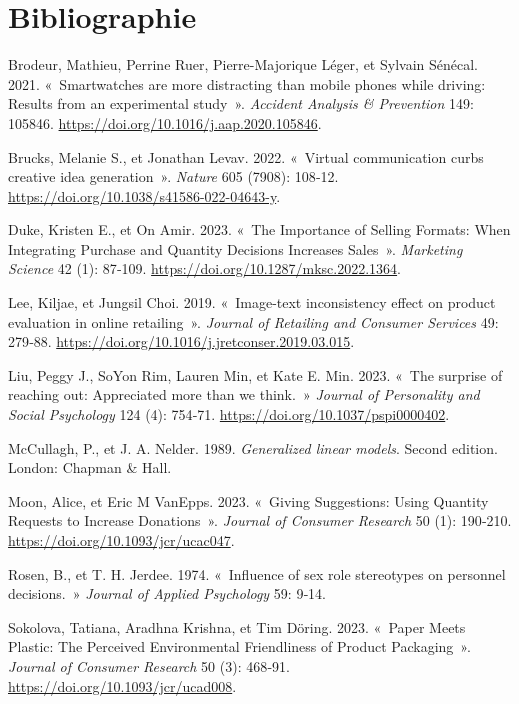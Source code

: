\documentclass[
  11pt,
  letterpaper,
]{scrbook}
\newlength{\cslhangindent}
\newenvironment{CSLReferences}[2] %
 {\begin{list}{}{%
  \setlength{\itemindent}{0pt}
  \setlength{\leftmargin}{0pt}
  \setlength{\parsep}{0pt}
  \ifodd #1
   \setlength{\leftmargin}{\cslhangindent}
   \setlength{\itemindent}{-1\cslhangindent}
  \fi
  \setlength{\itemsep}{#2\baselineskip}}}
 {\end{list}}
\theoremstyle{definition}
\theoremstyle{definition}
\theoremstyle{remark}
\begin{document}
\chapter*{Bibliographie}\label{bibliographie}


\label{refs}
\begin{CSLReferences}{1}{0}
Brodeur, Mathieu, Perrine Ruer, Pierre-Majorique Léger, et Sylvain
Sénécal. 2021. {«~Smartwatches are more distracting than mobile phones
while driving: Results from an experimental study~»}. \emph{Accident
Analysis \& Prevention} 149: 105846.
\url{https://doi.org/10.1016/j.aap.2020.105846}.

Brucks, Melanie S., et Jonathan Levav. 2022. {«~Virtual communication
curbs creative idea generation~»}. \emph{Nature} 605 (7908): 108‑12.
\url{https://doi.org/10.1038/s41586-022-04643-y}.

Duke, Kristen E., et On Amir. 2023. {«~The Importance of Selling
Formats: When Integrating Purchase and Quantity Decisions Increases
Sales~»}. \emph{Marketing Science} 42 (1): 87‑109.
\url{https://doi.org/10.1287/mksc.2022.1364}.

Lee, Kiljae, et Jungsil Choi. 2019. {«~Image-text inconsistency effect
on product evaluation in online retailing~»}. \emph{Journal of Retailing
and Consumer Services} 49: 279‑88.
\url{https://doi.org/10.1016/j.jretconser.2019.03.015}.

Liu, Peggy J., SoYon Rim, Lauren Min, et Kate E. Min. 2023. {«~The
surprise of reaching out: Appreciated more than we think.~»}
\emph{Journal of Personality and Social Psychology} 124 (4): 754‑71.
\url{https://doi.org/10.1037/pspi0000402}.

McCullagh, P., et J. A. Nelder. 1989. \emph{Generalized linear models}.
{S}econd edition. London: Chapman \& Hall.

Moon, Alice, et Eric M VanEpps. 2023. {«~Giving Suggestions: Using
Quantity Requests to Increase Donations~»}. \emph{Journal of Consumer
Research} 50 (1): 190‑210. \url{https://doi.org/10.1093/jcr/ucac047}.

Rosen, B., et T. H. Jerdee. 1974. {«~Influence of sex role stereotypes
on personnel decisions.~»} \emph{Journal of Applied Psychology} 59:
9‑14.

Sokolova, Tatiana, Aradhna Krishna, et Tim Döring. 2023. {«~Paper Meets
Plastic: The Perceived Environmental Friendliness of Product
Packaging~»}. \emph{Journal of Consumer Research} 50 (3): 468‑91.
\url{https://doi.org/10.1093/jcr/ucad008}.

\end{CSLReferences}


\backmatter
\end{document}
